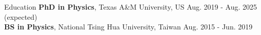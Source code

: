 \documentclass{resume}
\begin{document}


\vspace{-1.25em}
\begin{rSection}{Education}
\vspace{-0.25em}
{\bf PhD in Physics}, Texas A\&M University, US \hfill {Aug. 2019 - Aug. 2025 (expected)} \\
{\bf BS in Physics}, National Tsing Hua University, Taiwan \hfill {Aug. 2015 - Jun. 2019}
\end{rSection}
\end{document}

